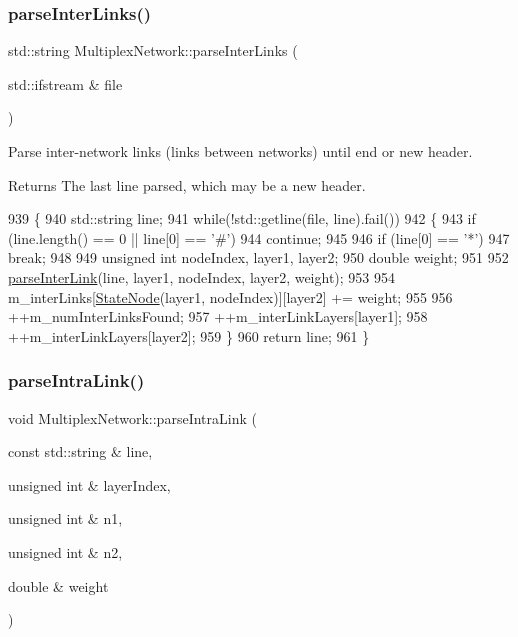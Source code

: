 \subsubsection{\texorpdfstring{parse\+Inter\+Links()}{parseInterLinks()}}
{\footnotesize\ttfamily std\+::string Multiplex\+Network\+::parse\+Inter\+Links (\begin{DoxyParamCaption}\item[{std\+::ifstream \&}]{file }\end{DoxyParamCaption})\hspace{0.3cm}{\ttfamily [protected]}}

Parse inter-\/network links (links between networks) until end or new header. \begin{DoxyReturn}{Returns}
The last line parsed, which may be a new header. 
\end{DoxyReturn}

\begin{DoxyCode}
939 \{
940     std::string line;
941     \textcolor{keywordflow}{while}(!std::getline(file, line).fail())
942     \{
943         \textcolor{keywordflow}{if} (line.length() == 0 || line[0] == \textcolor{charliteral}{'#'})
944             \textcolor{keywordflow}{continue};
945 
946         \textcolor{keywordflow}{if} (line[0] == \textcolor{charliteral}{'*'})
947             \textcolor{keywordflow}{break};
948 
949         \textcolor{keywordtype}{unsigned} \textcolor{keywordtype}{int} nodeIndex, layer1, layer2;
950         \textcolor{keywordtype}{double} weight;
951 
952         \mbox{\hyperlink{classMultiplexNetwork_a48d45b3e0738f2e755e67ebf7aeac728}{parseInterLink}}(line, layer1, nodeIndex, layer2, weight);
953 
954         m\_interLinks[\mbox{\hyperlink{structStateNode}{StateNode}}(layer1, nodeIndex)][layer2] += weight;
955 
956         ++m\_numInterLinksFound;
957         ++m\_interLinkLayers[layer1];
958         ++m\_interLinkLayers[layer2];
959     \}
960     \textcolor{keywordflow}{return} line;
961 \}
\end{DoxyCode}
\mbox{\label{classMultiplexNetwork_a3d6c1aff64a77c74e9c998a796762777}} 
\subsubsection{\texorpdfstring{parse\+Intra\+Link()}{parseIntraLink()}}
{\footnotesize\ttfamily void Multiplex\+Network\+::parse\+Intra\+Link (\begin{DoxyParamCaption}\item[{const std\+::string \&}]{line,  }\item[{unsigned int \&}]{layer\+Index,  }\item[{unsigned int \&}]{n1,  }\item[{unsigned int \&}]{n2,  }\item[{double \&}]{weight }\end{DoxyParamCaption})\hspace{0.3cm}{\ttfamily [protected]}}

